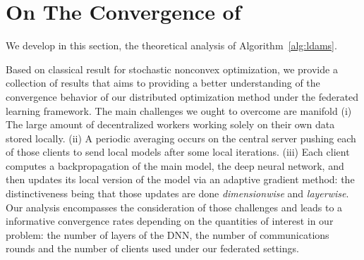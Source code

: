 \documentclass[11pt]{article}
\begin{document}
\section{On The Convergence of \algo}\label{sec:theory}
We develop in this section, the theoretical analysis of Algorithm~\ref{alg:ldams}. 


Based on classical result for stochastic nonconvex optimization, we provide a collection of results that aims to providing a better understanding of the convergence behavior of our distributed optimization method under the federated learning framework.
The main challenges we ought to overcome are manifold 
(i) The large amount of decentralized workers working solely on their own data stored locally. 
(ii) A periodic averaging occurs on the central server pushing each of those clients to send local models after some local iterations. 
(iii) Each client computes a backpropagation of the main model, \ie the deep neural network, and then updates its local version of the model via an adaptive gradient method: the distinctiveness being that those updates are done \emph{dimensionwise} and \emph{layerwise}.
Our analysis encompasses the consideration of those challenges and leads to a informative convergence rates depending on the quantities of interest in our problem: the number of layers of the DNN, the number of communications rounds and the number of clients used under our federated settings.
\end{document}
